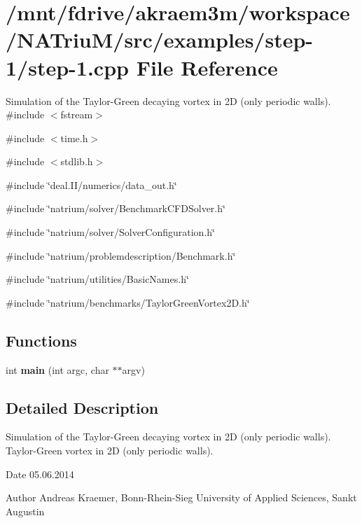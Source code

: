 \hypertarget{step-1_8cpp}{
\section{/mnt/fdrive/akraem3m/workspace/NATriuM/src/examples/step-\/1/step-\/1.cpp File Reference}
\label{step-1_8cpp}
}


Simulation of the Taylor-\/Green decaying vortex in 2D (only periodic walls).  
{\ttfamily \#include $<$fstream$>$}\par
{\ttfamily \#include $<$time.h$>$}\par
{\ttfamily \#include $<$stdlib.h$>$}\par
{\ttfamily \#include \char`\"{}deal.II/numerics/data\_\-out.h\char`\"{}}\par
{\ttfamily \#include \char`\"{}natrium/solver/BenchmarkCFDSolver.h\char`\"{}}\par
{\ttfamily \#include \char`\"{}natrium/solver/SolverConfiguration.h\char`\"{}}\par
{\ttfamily \#include \char`\"{}natrium/problemdescription/Benchmark.h\char`\"{}}\par
{\ttfamily \#include \char`\"{}natrium/utilities/BasicNames.h\char`\"{}}\par
{\ttfamily \#include \char`\"{}natrium/benchmarks/TaylorGreenVortex2D.h\char`\"{}}\par
\subsection*{Functions}
\begin{DoxyCompactItemize}
\item 
\hypertarget{step-1_8cpp_a3c04138a5bfe5d72780bb7e82a18e627}{
int {\bfseries main} (int argc, char $\ast$$\ast$argv)}
\label{step-1_8cpp_a3c04138a5bfe5d72780bb7e82a18e627}

\end{DoxyCompactItemize}


\subsection{Detailed Description}
Simulation of the Taylor-\/Green decaying vortex in 2D (only periodic walls). Taylor-\/Green vortex in 2D (only periodic walls).

\begin{DoxyDate}{Date}
05.06.2014 
\end{DoxyDate}
\begin{DoxyAuthor}{Author}
Andreas Kraemer, Bonn-\/Rhein-\/Sieg University of Applied Sciences, Sankt Augustin 
\end{DoxyAuthor}
